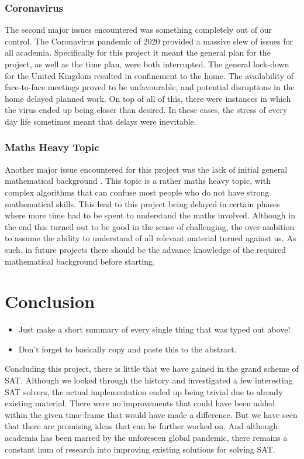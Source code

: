 \documentclass{article}
\begin{document}
\subsubsection{Coronavirus}
The second major issues encountered was something completely out of our control. The Coronavirus pandemic of 2020 provided a
massive slew of issues for all academia. Specifically for this project it meant the general plan for the project, as well as the
time plan, were both interrupted. The general lock-down for the United Kingdom resulted in confinement to the home. The
availability of face-to-face meetings proved to be unfavourable, and potential disruptions in the home delayed planned work. On
top of all of this, there were instances in which the virus ended up being closer than desired. In these cases, the stress of
every day life sometimes meant that delays were inevitable.

\subsubsection{Maths Heavy Topic}
Another major issue encountered for this project was the lack of initial general mathematical background . This topic is a rather
maths heavy topic, with complex algorithms that can confuse most people who do not have strong mathematical skills. This lead to
this project being delayed in certain phases where more time had to be spent to understand the maths involved. Although in the end
this turned out to be good in the sense of challenging, the over-ambition to assume the ability to understand of all relevant
material turned against us. As such, in future projects there should be the advance knowledge of the required mathematical
background before starting.

\section{Conclusion}
\begin{itemize}
    \item Just make a short summary of every single thing that was typed out above!
    \item Don't forget to basically copy and paste this to the abstract.
\end{itemize}
Concluding this project, there is little that we have gained in the grand scheme of SAT. Although we looked through the history
and investigated a few interesting SAT solvers, the actual implementation ended up being trivial due to already existing material.
There were no improvements that could have been added within the given time-frame that would have made a difference. But we have
seen that there are promising ideas that can be further worked on. And although academia has been marred by the unforeseen global
pandemic, there remains a constant hum of research into improving existing solutions for solving SAT.

\newpage


\end{document}
